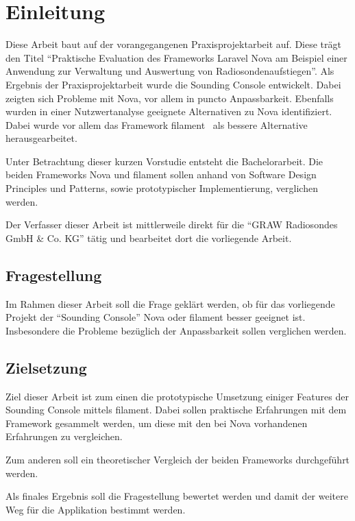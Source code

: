 \section{Einleitung}

Diese Arbeit baut auf der vorangegangenen Praxisprojektarbeit auf.
Diese trägt den Titel \enquote{Praktische Evaluation des Frameworks Laravel Nova am Beispiel einer Anwendung zur Verwaltung und Auswertung von Radiosondenaufstiegen}.
Als Ergebnis der Praxisprojektarbeit wurde die Sounding Console entwickelt.
Dabei zeigten sich Probleme mit Nova, vor allem in puncto Anpassbarkeit.
Ebenfalls wurden in einer Nutzwertanalyse geeignete Alternativen zu Nova identifiziert.
Dabei wurde vor allem das Framework filament~\cite{filament} als bessere Alternative herausgearbeitet.

Unter Betrachtung dieser kurzen Vorstudie entsteht die Bachelorarbeit.
Die beiden Frameworks Nova und filament sollen anhand von Software Design Principles und Patterns, sowie prototypischer Implementierung, verglichen werden.

Der Verfasser dieser Arbeit ist mittlerweile direkt für die \enquote{GRAW Radiosondes GmbH \& Co. KG}\cite{graw} tätig und bearbeitet dort die vorliegende Arbeit.

\subsection{Fragestellung}
Im Rahmen dieser Arbeit soll die Frage geklärt werden, ob für das vorliegende Projekt der \enquote{Sounding Console} Nova oder filament besser geeignet ist.
Insbesondere die Probleme bezüglich der Anpassbarkeit sollen verglichen werden.

\subsection{Zielsetzung}
Ziel dieser Arbeit ist zum einen die prototypische Umsetzung einiger Features der Sounding Console mittels filament.
Dabei sollen praktische Erfahrungen mit dem Framework gesammelt werden, um diese mit den bei Nova vorhandenen Erfahrungen zu vergleichen.

Zum anderen soll ein theoretischer Vergleich der beiden Frameworks durchgeführt werden.

Als finales Ergebnis soll die Fragestellung bewertet werden und damit der weitere Weg für die Applikation bestimmt werden.
